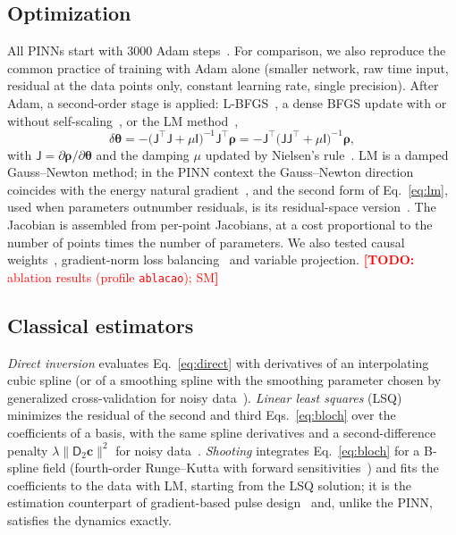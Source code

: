 \documentclass[aps,pra,twocolumn,superscriptaddress,10pt,longbibliography,floatfix]{revtex4-2}
\newif\ifshowtodos \showtodostrue
\newcommand{\TODO}[1]{\ifshowtodos\textcolor{red}{\textbf{[TODO:} #1\textbf{]}}\fi}
\begin{document}
\subsection{Optimization}\label{sec:optimization}
All PINNs start with $3000$ Adam steps~\cite{kingma2015adam}. For comparison, we also reproduce the
common practice of training with Adam alone (smaller network, raw time input, residual at the data
points only, constant learning rate, single precision). After Adam, a second-order stage is applied:
L-BFGS~\cite{liu1989lbfgs}, a dense BFGS update with or without self-scaling~\cite{nocedal2006numerical,
urban2025unveiling,kiyani2025optimizer}, or the LM method~\cite{levenberg1944,marquardt1963},
\begin{equation}
  \delta\bm\theta = -\big(\mathsf J^{\top}\mathsf J+\mu\mathsf I\big)^{-1}\mathsf J^{\top}\bm\rho
                  = -\mathsf J^{\top}\big(\mathsf J\mathsf J^{\top}+\mu\mathsf I\big)^{-1}\bm\rho ,
  \label{eq:lm}
\end{equation}
with $\mathsf J=\partial\bm\rho/\partial\bm\theta$ and the damping $\mu$ updated by Nielsen's
rule~\cite{nielsen1999damping}. LM is a damped Gauss--Newton method; in the PINN context the
Gauss--Newton direction coincides with the energy natural gradient~\cite{muller2023engd,jnini2024gnngd},
and the second form of Eq.~\eqref{eq:lm}, used when parameters outnumber residuals, is its
residual-space version~\cite{jnini2025dual}. The Jacobian is assembled from per-point Jacobians, at a
cost proportional to the number of points times the number of parameters. We also tested causal
weights~\cite{wang2022causality}, gradient-norm loss balancing~\cite{wang2021gradient} and variable
projection. \TODO{ablation results (profile \texttt{ablacao}); SM}

\subsection{Classical estimators}\label{sec:classical}
\emph{Direct inversion} evaluates Eq.~\eqref{eq:direct} with derivatives of an interpolating cubic
spline (or of a smoothing spline with the smoothing parameter chosen by generalized cross-validation for
noisy data~\cite{hansen2010discrete}). \emph{Linear least squares} (LSQ) minimizes the residual of the
second and third Eqs.~\eqref{eq:bloch} over the coefficients of a basis, with the same spline
derivatives and a second-difference penalty $\lambda\|\mathsf D_2\bm c\|^2$ for noisy
data~\cite{eilers1996psplines,hansen2010discrete}. \emph{Shooting} integrates Eq.~\eqref{eq:bloch} for
a B-spline field (fourth-order Runge--Kutta with forward sensitivities~\cite{hairer1993ode}) and fits the
coefficients to the data with LM, starting from the LSQ solution; it is the estimation counterpart of
gradient-based pulse design~\cite{khaneja2005grape} and, unlike the PINN, satisfies the dynamics exactly.
\end{document}
